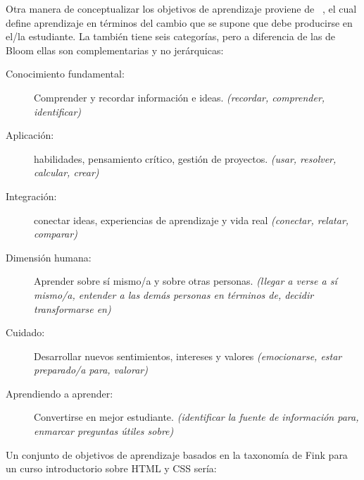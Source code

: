 Otra manera de conceptualizar los objetivos de aprendizaje proviene de ~\cite{Fink2013},
el cual define aprendizaje en términos del cambio que se supone que debe producirse en el/la estudiante.
La  también tiene seis categorías,
pero a diferencia de las de Bloom ellas son complementarias y no jerárquicas:
 
\begin{description}
 
\item[Conocimiento fundamental:]
  Comprender y recordar información e ideas.
  \emph{(recordar, comprender, identificar)}
 
\item[Aplicación:]
  habilidades, pensamiento crítico, gestión de proyectos.
  \emph{(usar, resolver, calcular, crear)}
 
\item[Integración:]
  conectar ideas, experiencias de aprendizaje y vida real
  \emph{(conectar, relatar, comparar)}
 
\item[Dimensión humana:]
  Aprender sobre sí mismo/a y sobre otras personas.
  \emph{(llegar a verse a sí mismo/a, entender a las demás personas en términos de, decidir transformarse en)}
 
\item[Cuidado:]
  Desarrollar nuevos sentimientos, intereses y valores
  \emph{(emocionarse, estar preparado/a para, valorar)}
 
\item[Aprendiendo a aprender:]
  Convertirse en mejor estudiante.
  \emph{(identificar la fuente de información para, enmarcar preguntas útiles sobre)}
 
\end{description}
 
Un conjunto de objetivos de aprendizaje basados en la taxonomía de Fink para un curso introductorio sobre HTML y CSS sería:
 

